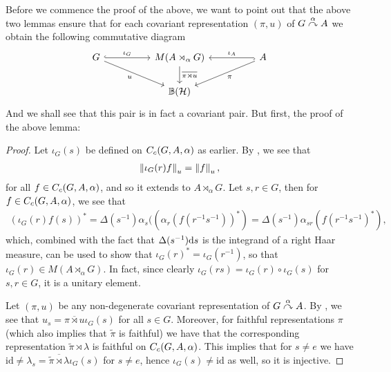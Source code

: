 Before we commence the proof of the above, we want to point out that the above two lemmas ensure that for each covariant representation $(\pi , u)$ of $G \stackrel{\alpha}{\curvearrowright} A$ we obtain the following commutative diagram
\begin{equation}
\begin{tikzcd}
	G \arrow[rr, "\iota_G", hook] \arrow[rrd, "u"'] && M(A \rtimes_\alpha G) \arrow[d, "\overline{\pi \rtimes u }"] && A \arrow[ll,"\iota_A"',hook] \arrow[lld, "\pi"]\\
	& &\mathbb{B}(\H)&&
\end{tikzcd}
\label{diag:iotacom}
\end{equation}
And we shall see that this pair is in fact a covariant pair. But first, the proof of the above lemma:
\begin{proof}
Let $\iota_G(s)$ be defined on $C_c(G,A,\alpha)$ as earlier. By , we see that
\begin{align*}
	\left\lVert \iota_G(r) f \right\rVert_u = \left\lVert f \right\rVert_u,
\end{align*}
for all $f \in C_c(G,A,\alpha)$, and so it extends to $A \rtimes_\alpha G$. Let $s,r \in G$, then for $f \in C_c(G,A,\alpha)$, we see that
\begin{align*}
	(\iota_G(r) f(s))^* = \Delta(s^{-1}) \alpha_s ( (\alpha_r(f(r^{-1}s^{-1}))^*)= \Delta(s^{-1}) \alpha_{sr}(f(r^{-1}s^{-1})^*),
\end{align*}
which, combined with the fact that $\Delta(s^{-1}) \mathrm{d} s$ is the integrand of a right Haar measure, can be used to show that $\iota_G(r)^* = \iota_G(r^{-1})$, so that $\iota_G(r) \in M(A \rtimes_\alpha G)$. In fact, since clearly $\iota_G(rs) = \iota_G(r) \circ \iota_G(s)$ for $s,r \in G$, it is a unitary element.

Let $(\pi,u)$ be any non-degenerate covariant representation of $G \stackrel{\alpha}{\curvearrowright} A$. By , we see that $u_s  = \overline{ \pi \rtimes u} \iota_G(s)$ for all $ s \in G$. Moreover, for faithful representations $\pi$ (which also implies that $\tilde \pi$ is faithful) we have that the corresponding representation $\tilde \pi \rtimes \lambda$ is faithful on $C_c(G,A,\alpha)$. This implies that for $s \neq e$ we have $\mathrm{id} \neq \lambda_s = \overline{\tilde \pi \rtimes \lambda} \iota_G(s)$ for $s \neq e$, hence $\iota_G(s) \neq \mathrm{id}$ as well, so it is injective.
	


\end{proof}
